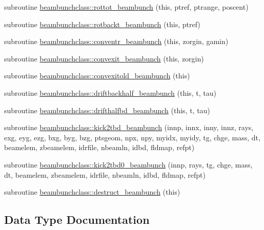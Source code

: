 \begin{DoxyCompactItemize}
\item 
subroutine \mbox{\hyperlink{namespacebeambunchclass_a6708b67cc6ed6cbdbba8340d6512ab4f}{beambunchclass\+::rottot\+\_\+beambunch}} (this, ptref, ptrange, poscent)
\item 
subroutine \mbox{\hyperlink{namespacebeambunchclass_a26facece08e7014e20db987d5df33c42}{beambunchclass\+::rotbackt\+\_\+beambunch}} (this, ptref)
\item 
subroutine \mbox{\hyperlink{namespacebeambunchclass_a875b1de387c0e2e667bfa7a33bb70311}{beambunchclass\+::conventr\+\_\+beambunch}} (this, zorgin, gamin)
\item 
subroutine \mbox{\hyperlink{namespacebeambunchclass_a4126361c8be17915e9c6c24697801f47}{beambunchclass\+::convexit\+\_\+beambunch}} (this, zorgin)
\item 
subroutine \mbox{\hyperlink{namespacebeambunchclass_a53657fc9705a5a612bc5775c121c314e}{beambunchclass\+::convexitold\+\_\+beambunch}} (this)
\item 
subroutine \mbox{\hyperlink{namespacebeambunchclass_ae62dcc6dbc6d31b22daefa701822d49d}{beambunchclass\+::driftbackhalf\+\_\+beambunch}} (this, t, tau)
\item 
subroutine \mbox{\hyperlink{namespacebeambunchclass_a45079536068a233e490ed282b4225c93}{beambunchclass\+::drifthalfbd\+\_\+beambunch}} (this, t, tau)
\item 
subroutine \mbox{\hyperlink{namespacebeambunchclass_a513182caa95677071325abf64bba8279}{beambunchclass\+::kick2tbd\+\_\+beambunch}} (innp, innx, inny, innz, rays, exg, eyg, ezg, bxg, byg, bzg, ptsgeom, npx, npy, myidx, myidy, tg, chge, mass, dt, beamelem, zbeamelem, idrfile, nbeamln, idbd, fldmap, refpt)
\item 
subroutine \mbox{\hyperlink{namespacebeambunchclass_a38583f97e581a51940801aeb0f8398a0}{beambunchclass\+::kick2tbd0\+\_\+beambunch}} (innp, rays, tg, chge, mass, dt, beamelem, zbeamelem, idrfile, nbeamln, idbd, fldmap, refpt)
\item 
subroutine \mbox{\hyperlink{namespacebeambunchclass_a0fe1e4d236f209b18f75b272bf07782d}{beambunchclass\+::destruct\+\_\+beambunch}} (this)
\end{DoxyCompactItemize}


\subsection{Data Type Documentation}
\label{structbeambunchclass_1_1beambunch}
